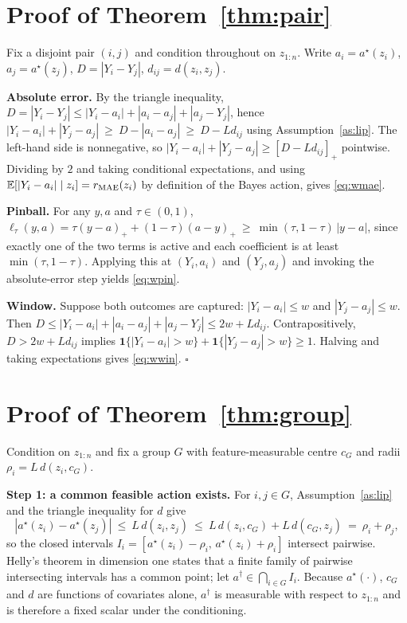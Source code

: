 \documentclass[11pt]{article}
\theoremstyle{definition}
\newcommand{\E}{\mathbb{E}}
\newcommand{\ind}{\mathbf{1}}
\newcommand{\clip}[1]{\left[#1\right]_+}
\begin{document}
\appendix
\section{Proof of Theorem~\ref{thm:pair}}\label{app:pair}

Fix a disjoint pair $(i,j)$ and condition throughout on $z_{1:n}$. Write $a_i=a^\star(z_i)$, $a_j=a^\star(z_j)$, $D=|Y_i-Y_j|$, $d_{ij}=d(z_i,z_j)$.

\textbf{Absolute error.} By the triangle inequality,
$D=|Y_i-Y_j|\le |Y_i-a_i|+|a_i-a_j|+|a_j-Y_j|$, hence
$|Y_i-a_i|+|Y_j-a_j|\ \ge\ D-|a_i-a_j|\ \ge\ D-L d_{ij}$
using Assumption~\ref{as:lip}. The left-hand side is nonnegative, so
$|Y_i-a_i|+|Y_j-a_j|\ge\clip{D-Ld_{ij}}$ pointwise. Dividing by $2$ and taking conditional expectations, and using $\E[|Y_i-a_i|\mid z_i]=r_{\rm MAE}(z_i)$ by definition of the Bayes action, gives \eqref{eq:wmae}.

\textbf{Pinball.} For any $y,a$ and $\tau\in(0,1)$,
$\ell_\tau(y,a)=\tau(y-a)_++(1-\tau)(a-y)_+\ \ge\ \min(\tau,1-\tau)\,|y-a|$,
since exactly one of the two terms is active and each coefficient is at least $\min(\tau,1-\tau)$. Applying this at $(Y_i,a_i)$ and $(Y_j,a_j)$ and invoking the absolute-error step yields \eqref{eq:wpin}.

\textbf{Window.} Suppose both outcomes are captured: $|Y_i-a_i|\le w$ and $|Y_j-a_j|\le w$. Then
$D\le|Y_i-a_i|+|a_i-a_j|+|a_j-Y_j|\le 2w+Ld_{ij}$.
Contrapositively, $D>2w+Ld_{ij}$ implies $\ind\{|Y_i-a_i|>w\}+\ind\{|Y_j-a_j|>w\}\ge 1$. Halving and taking expectations gives \eqref{eq:wwin}. \hfill$\square$

\section{Proof of Theorem~\ref{thm:group}}\label{app:group}

Condition on $z_{1:n}$ and fix a group $G$ with feature-measurable centre $c_G$ and radii $\rho_i=L\,d(z_i,c_G)$.

\textbf{Step 1: a common feasible action exists.} For $i,j\in G$, Assumption~\ref{as:lip} and the triangle inequality for $d$ give
\[
|a^\star(z_i)-a^\star(z_j)|\ \le\ L\,d(z_i,z_j)\ \le\ L\,d(z_i,c_G)+L\,d(c_G,z_j)\ =\ \rho_i+\rho_j ,
\]
so the closed intervals $I_i=[a^\star(z_i)-\rho_i,\,a^\star(z_i)+\rho_i]$ intersect pairwise. Helly's theorem in dimension one states that a finite family of pairwise intersecting intervals has a common point; let $a^\dagger\in\bigcap_{i\in G}I_i$. Because $a^\star(\cdot)$, $c_G$ and $d$ are functions of covariates alone, $a^\dagger$ is measurable with respect to $z_{1:n}$ and is therefore a fixed scalar under the conditioning.
\end{document}
